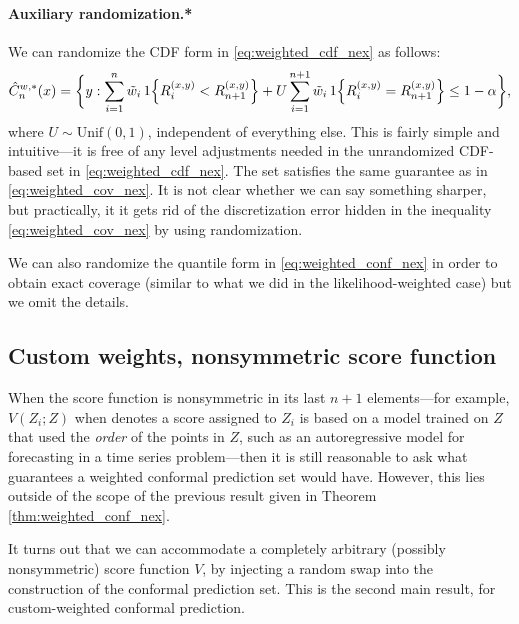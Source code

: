 \documentclass{article}
\begin{document}
\paragraph{Auxiliary randomization.*}

We can randomize the CDF form in \eqref{eq:weighted_cdf_nex} as follows: 
\[
\hat{C}_n^{w,*}(x) = \bigg\{ y : \sum_{i=1}^n \tilde{w}_i \, 1\Big\{ R_i^{(x,y)} <
R^{(x,y)}_{n+1} \Big\} + U \sum_{i=1}^{n+1} \tilde{w}_i \, 1\Big\{ R_i^{(x,y)} =
R^{(x,y)}_{n+1} \Big\} \leq 1-\alpha \bigg\},
\]
where $U \sim \mathrm{Unif}(0,1)$, independent of everything else. This is
fairly simple and intuitive---it is free of any level adjustments needed in the   
unrandomized CDF-based set in \eqref{eq:weighted_cdf_nex}. The set
 satisfies the same guarantee as in
\eqref{eq:weighted_cov_nex}. It is not clear whether we can say something
sharper, but practically, it it gets rid of the discretization error hidden in 
the inequality \eqref{eq:weighted_cov_nex} by using randomization. 

We can also randomize the quantile form in \eqref{eq:weighted_conf_nex} in order
to obtain exact coverage (similar to what we did in the likelihood-weighted
case) but we omit the details. 

\subsection{Custom weights, nonsymmetric score function}

When the score function is nonsymmetric in its last $n+1$ elements---for
example, $V(Z_i; Z)$ when denotes a score assigned to $Z_i$ is based on a model
trained on $Z$ that used the \emph{order} of the points in $Z$, such as an
autoregressive model for forecasting in a time series problem---then it is still
reasonable to ask what guarantees a weighted conformal prediction set would
have. However, this lies outside of the scope of the previous result given in
Theorem \ref{thm:weighted_conf_nex}.  

It turns out that we can accommodate a completely arbitrary (possibly
nonsymmetric) score function $V$, by injecting a random swap into the
construction of the conformal prediction set. This is the second main result,
for custom-weighted conformal prediction.      
\end{document}
